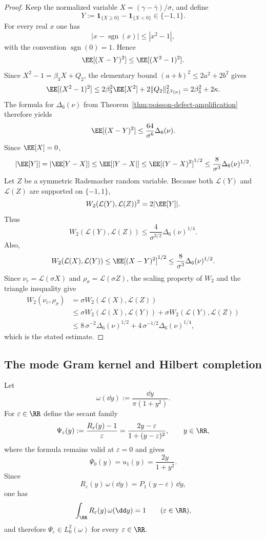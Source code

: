 \begin{proof}
Keep the normalized variable $X=(\gamma-\bar\gamma)/\sigma$, and define
\[
Y:=\mathbf{1}_{\{X\ge 0\}}-\mathbf{1}_{\{X<0\}}\in\{-1,1\}.
\]
For every real $x$ one has
\[
|x-\operatorname{sgn}(x)|\le |x^2-1|,
\]
with the convention $\operatorname{sgn}(0)=1$.  Hence
\[
\EE[(X-Y)^2]\le \EE[(X^2-1)^2].
\]
Since $X^2-1=\beta_3X+Q_2$, the elementary bound
$(a+b)^2\le 2a^2+2b^2$ gives
\[
\EE[(X^2-1)^2]
\le 2\beta_3^2\EE[X^2]+2\|Q_2\|_{L^2(\nu)}^2
=2\beta_3^2+2\kappa.
\]
The formula for $\Delta_6(\nu)$ from
Theorem~\ref{thm:poisson-defect-amplification} therefore yields
\[
\EE[(X-Y)^2]\le \frac{64}{\sigma^6}\Delta_6(\nu).
\]
Since $\EE[X]=0$,
\[
|\EE[Y]|=|\EE[Y-X]|
\le \EE[|Y-X|]
\le \EE[(Y-X)^2]^{1/2}
\le \frac{8}{\sigma^3}\Delta_6(\nu)^{1/2}.
\]
Let $Z$ be a symmetric Rademacher random variable.  Because both
$\mathcal L(Y)$ and $\mathcal L(Z)$ are supported on $\{-1,1\}$,
\[
W_2(\mathcal L(Y),\mathcal L(Z))^2=2|\EE[Y]|.
\]
Thus
\[
W_2(\mathcal L(Y),\mathcal L(Z))
\le \frac{4}{\sigma^{3/2}}\Delta_6(\nu)^{1/4}.
\]
Also,
\[
W_2(\mathcal L(X),\mathcal L(Y))
\le \EE[(X-Y)^2]^{1/2}
\le \frac{8}{\sigma^3}\Delta_6(\nu)^{1/2}.
\]
Since $\nu_c=\mathcal L(\sigma X)$ and $\rho_\sigma=\mathcal L(\sigma Z)$,
the scaling property of $W_2$ and the triangle inequality give
\begin{align*}
W_2(\nu_c,\rho_\sigma)
&=\sigma W_2(\mathcal L(X),\mathcal L(Z)) \\
&\le \sigma W_2(\mathcal L(X),\mathcal L(Y))
+\sigma W_2(\mathcal L(Y),\mathcal L(Z)) \\
&\le
8\,\sigma^{-2}\Delta_6(\nu)^{1/2}
+4\,\sigma^{-1/2}\Delta_6(\nu)^{1/4},
\end{align*}
which is the stated estimate.
\end{proof}

\subsection{The mode Gram kernel and Hilbert completion}

Let
\[
\omega(\dd y):=\frac{\dd y}{\pi(1+y^2)}.
\]
For $\varepsilon\in\RR$ define the secant family
\begin{equation}\label{eq:mode-secant-family}
\Psi_\varepsilon(y):=\frac{R_\varepsilon(y)-1}{\varepsilon}
=\frac{2y-\varepsilon}{1+(y-\varepsilon)^2},
\qquad y\in\RR,
\end{equation}
where the formula remains valid at $\varepsilon=0$ and gives
\[
\Psi_0(y)=u_1(y)=\frac{2y}{1+y^2}.
\]
Since
\[
R_\varepsilon(y)\,\omega(\dd y)=P_1(y-\varepsilon)\,\dd y,
\]
one has
\[
\int_{\RR}R_\varepsilon(y)\,\omega(\dd y)=1
\qquad(\varepsilon\in\RR),
\]
and therefore $\Psi_\varepsilon\in L^2_0(\omega)$ for every
$\varepsilon\in\RR$.

